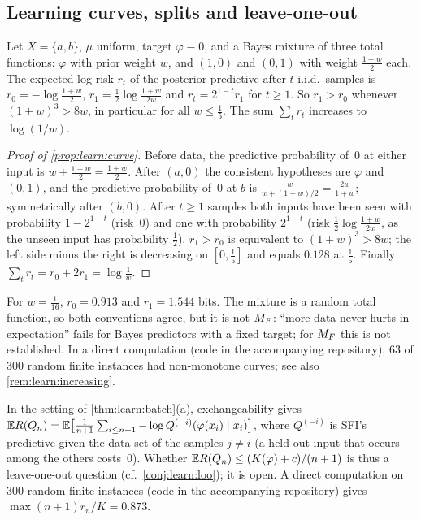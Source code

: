 \subsection{Learning curves, splits and leave-one-out}\label{app:learn:splits}

\begin{proposition}\label{prop:learn:curve}
Let $X=\{a,b\}$, $\mu$ uniform, target $\varphi\equiv0$, and a Bayes mixture of three total functions: $\varphi$ with prior weight $w$, and $(1,0)$ and $(0,1)$ with weight $\frac{1-w}2$ each. The expected log risk $r_t$ of the posterior predictive after $t$ i.i.d.\ samples is $r_0=-\log\frac{1+w}2$, $r_1=\frac12\log\frac{1+w}{2w}$ and $r_t=2^{1-t}r_1$ for $t\ge1$. So $r_1>r_0$ whenever $(1+w)^3>8w$, in particular for all $w\le\frac15$. The sum $\sum_tr_t$ increases to $\log(1/w)$.
\end{proposition}

\begin{proof}[Proof of \cref{prop:learn:curve}]
Before data, the predictive probability of~$0$ at either input is $w+\frac{1-w}2=\frac{1+w}2$. After $(a,0)$ the consistent hypotheses are $\varphi$ and $(0,1)$, and the predictive probability of~$0$ at $b$ is $\frac{w}{w+(1-w)/2}=\frac{2w}{1+w}$; symmetrically after $(b,0)$. After $t\ge1$ samples both inputs have been seen with probability $1-2^{1-t}$ (risk~$0$) and one with probability $2^{1-t}$ (risk $\frac12\log\frac{1+w}{2w}$, as the unseen input has probability $\frac12$). $r_1>r_0$ is equivalent to $(1+w)^3>8w$; the left side minus the right is decreasing on $[0,\frac15]$ and equals $0.128$ at $\frac15$. Finally $\sum_tr_t=r_0+2r_1=\log\frac1w$.
\end{proof}

For $w=\frac1{16}$, $r_0=0.913$ and $r_1=1.544$ bits. The mixture is a random total function, so both conventions agree, but it is not $M_{F}$: ``more data never hurts in expectation'' fails for Bayes predictors with a fixed target; for $M_{F}$ this is not established. In a direct computation (code in the accompanying repository), $63$ of $300$ random finite instances had non-monotone curves; see also \cref{rem:learn:increasing}.

\begin{remark}\label{rem:learn:lastiterate}
In the setting of \cref{thm:learn:batch}(a), exchangeability gives $\mathbb{E} R(Q_n)=\mathbb{E}\big[\frac1{n+1}\sum_{i\le n+1}-\log Q^{(-i)}(\varphi(x_i)\mid x_i)\big]$, where $Q^{(-i)}$ is SFI's predictive given the data set of the samples $j\ne i$ (a held-out input that occurs among the others costs~$0$). Whether $\mathbb{E} R(Q_n)\le(K(\varphi)+c)/(n+1)$ is thus a leave-one-out question (cf.\ \cref{conj:learn:loo}); it is open. A direct computation on $300$ random finite instances (code in the accompanying repository) gives $\max(n+1)r_n/K=0.873$.
\end{remark}

